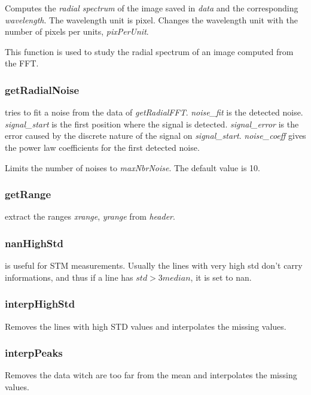 \bdf
{} Computes the \emph{radial spectrum} of the image saved in \emph{data} and the corresponding \emph{wavelength}. The wavelength unit is pixel.
 Changes the wavelength unit with the number of pixels per units, \emph{pixPerUnit}.
\edf

This function is used to study the radial spectrum of an image computed from the FFT.

\subsubsection{getRadialNoise}

\bdf
{} tries to fit a noise from the data of \emph{getRadialFFT}. \emph{noise\_fit} is the detected noise. \emph{signal\_start} is the first position where the signal is detected. \emph{signal\_error} is the error caused by the discrete nature of the signal on \emph{signal\_start}. \emph{noise\_coeff} gives the power law coefficients for the first detected noise.

 Limits the number of noises to \emph{maxNbrNoise}. The default value is 10.

\edf


\subsubsection{getRange}
\bdf
{} extract the ranges \emph{xrange}, \emph{yrange} from \emph{header}.
\edf

\subsubsection{nanHighStd}
\bdf
{} is useful for STM measurements. Usually the lines with very high std don't carry informations, and thus if a line has $std > 3 median$, it is set to nan.
\edf
\subsubsection{interpHighStd}
\bdf
{} Removes the lines with high STD values and interpolates the missing values.
\edf
\subsubsection{interpPeaks}
\bdf
{} Removes the data witch are too far from the mean and interpolates the missing values.
\edf

